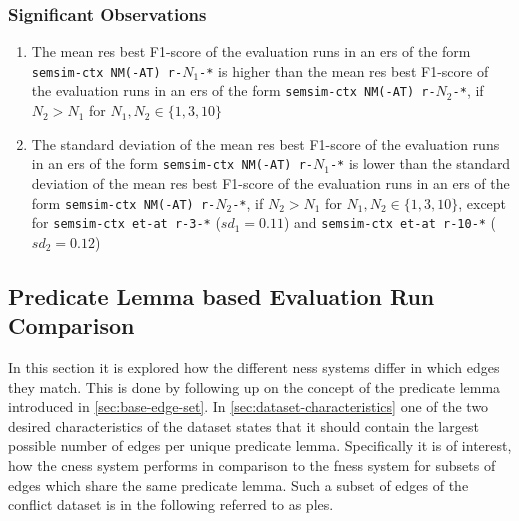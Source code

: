\documentclass[11pt, numbers=noenddot]{scrreprt}
\newcounter{listcounter}
\begin{document}
\subsubsection{Significant Observations}
\begin{enumerate}[label=\arabic{listcounter}.\arabic*]
	\item The mean \gls{res} best F1-score of the evaluation runs in an \gls{ers} of the form \texttt{semsim-ctx NM(-AT) r-\(N_1\)-*} is higher than the mean \gls{res} best F1-score of the evaluation runs in an \gls{ers} of the form \texttt{semsim-ctx NM(-AT) r-\(N_2\)-*}, if \(N_2 > N_1\) for \(N_1, N_2 \in \{1, 3, 10\}\) \label{obs-itm:cness-more-refs-higher-mean-best-f1}
	\item The standard deviation of the mean \gls{res} best F1-score of the evaluation runs in an \gls{ers} of the form \texttt{semsim-ctx NM(-AT) r-\(N_1\)-*} is lower than the standard deviation of the mean \gls{res} best F1-score of the evaluation runs in an \gls{ers} of the form \texttt{semsim-ctx NM(-AT) r-\(N_2\)-*}, if \(N_2 > N_1\) for \(N_1, N_2 \in \{1, 3, 10\}\), except for \texttt{semsim-ctx et-at r-3-*} (\(sd_1 = 0.11\)) and \texttt{semsim-ctx et-at r-10-*} (\(sd_2 = 0.12\)) \label{obs-itm:cness-more-refs-lower-stddev-best-f1}
\end{enumerate}



\subsection{Predicate Lemma based Evaluation Run Comparison}
In this section it is explored how the different \gls{ness} systems differ in which edges they match. This is done by following up on the concept of the predicate lemma introduced in \cref{sec:base-edge-set}. In \cref{sec:dataset-characteristics} one of the two desired characteristics of the dataset states that it should contain the largest possible number of edges per unique predicate lemma. Specifically it is of interest, how the \gls{cness} system performs in comparison to the \gls{fness} system for subsets of edges which share the same predicate lemma. Such a subset of edges of the conflict dataset is in the following referred to as \gls{ples}.


\end{document}
